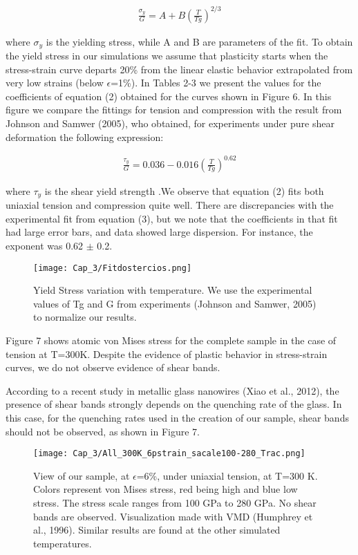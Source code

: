 \begin{eqnarray}
\frac{\sigma{}_{y}}{G} = A+B(\frac{T}{Tg})^{2/3}
\label{C3:eq:onsetPlast}
\end{eqnarray}

where $\sigma{}_{y}$ is the yielding stress, while A and B are parameters of the fit. To obtain the yield stress in our simulations we assume that plasticity starts when the stress-strain curve departs 20\% from the linear elastic behavior extrapolated from very low strains (below $\epsilon$=1\%). In Tables 2-3 we present the values for the coefficients of equation (2) obtained for the curves shown in Figure 6. In this figure we compare the fittings for tension and compression with the result from Johnson and Samwer (2005), who obtained, for experiments under pure shear deformation the following expression:

\begin{eqnarray}
\frac{\tau _{y}}{G} = 0.036-0.016(\frac{T}{Tg})^{0.62}
\label{C3:eq:johnsonSamwer}
\end{eqnarray}
	
where $\tau _{y}$ is the shear yield strength .We observe that equation (2) fits both uniaxial tension and compression quite well. There are discrepancies with the experimental fit from equation (3), but we note that the coefficients in that fit had large error bars, and data showed large dispersion. For instance, the exponent was 0.62 $\pm$ 0.2.

\begin{figure}[htp]
\centering
\texttt{[image: Cap\_3/Fitdostercios.png]}
\caption{Yield Stress variation with temperature. We use the experimental values of Tg and G from experiments (Johnson and Samwer, 2005) to normalize our results.}
\label{C3:fg:fitDosTercios}
\end{figure}

Figure 7 shows atomic von Mises stress for the complete sample in the case of tension at T=300K. Despite the evidence of plastic behavior in stress-strain curves, we do not observe evidence of shear bands.

According to a recent study in metallic glass nanowires (Xiao et al., 2012), the presence of shear bands strongly depends on the quenching rate of the glass. In this case, for the quenching rates used in the creation of our sample, shear bands should not be observed, as shown in Figure 7.

\begin{figure}[htp]
\centering
\texttt{[image: Cap\_3/All\_300K\_6pstrain\_sacale100-280\_Trac.png]}
\caption{View of our  sample, at $\epsilon$=6\%, under uniaxial tension, at T=300 K. Colors represent von Mises stress, red being high and blue low stress. The stress scale ranges from 100 GPa to 280 GPa. No shear bands are observed. Visualization made with VMD (Humphrey et al., 1996). Similar results are found at the other simulated temperatures.}
\label{C3:fg:sampleTen}
\end{figure}

